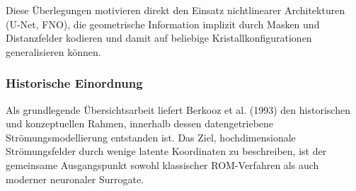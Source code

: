 \documentclass[a4paper,12pt]{article}
\begin{document}
Diese Überlegungen motivieren direkt den Einsatz nichtlinearer Architekturen (U-Net, FNO), die geometrische Information implizit durch Masken und Distanzfelder kodieren und damit auf beliebige Kristallkonfigurationen generalisieren können.

\subsubsection*{Historische Einordnung}

Als grundlegende Übersichtsarbeit liefert Berkooz et al. (1993) den historischen und konzeptuellen Rahmen, innerhalb dessen datengetriebene Strömungsmodellierung entstanden ist. Das Ziel, hochdimensionale Strömungsfelder durch wenige latente Koordinaten zu beschreiben, ist der gemeinsame Ausgangspunkt sowohl klassischer ROM-Verfahren als auch moderner neuronaler Surrogate.
\end{document}
